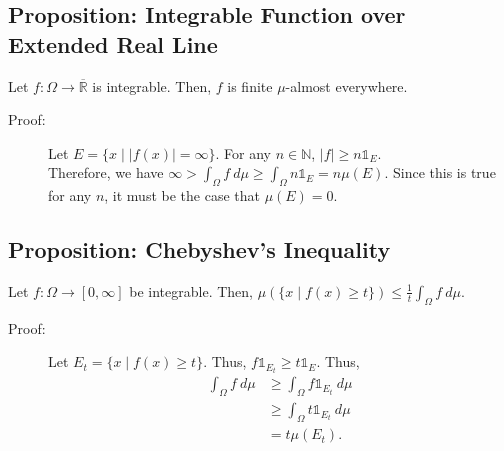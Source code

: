 \documentclass[9pt]{extarticle}
\newcommand{\N}{\mathbb{N}}
\newcommand{\R}{\mathbb{R}}
\begin{document}
  \subsection{Proposition: Integrable Function over Extended Real Line}%
  Let $f: \Omega \rightarrow \overline{\R}$ is integrable. Then, $f$ is finite $\mu$-almost everywhere.
  \begin{description}
    \item[Proof:] Let $E = \{x\mid |f(x)| = \infty\}$. For any $n\in \N$, $|f| \geq n\mathbb{1}_E$.\\

      Therefore, we have $\infty > \int_{\Omega}f~d\mu\geq \int_{\Omega}n\mathbb{1}_E = n\mu(E)$. Since this is true for any $n$, it must be the case that $\mu(E) = 0$.
  \end{description}
  \subsection{Proposition: Chebyshev's Inequality}%
  Let $f: \Omega \rightarrow [0,\infty]$ be integrable. Then, $\displaystyle \mu\left(\{x\mid f(x)\geq t\}\right) \leq \frac{1}{t}\int_{\Omega}f~d\mu$.
  \begin{description}
    \item[Proof:] Let $E_t = \{x\mid f(x) \geq t\}$. Thus, $f\mathbb{1}_{E_t} \geq t\mathbb{1}_E$. Thus,
      \begin{align*}
        \int_{\Omega}f~d\mu &\geq \int_{\Omega}f\mathbb{1}_{E_t}~d\mu\\
                            &\geq \int_{\Omega}t\mathbb{1}_{E_t}~d\mu\\
                            &= t\mu(E_t).
      \end{align*}
  \end{description}
\end{document}
